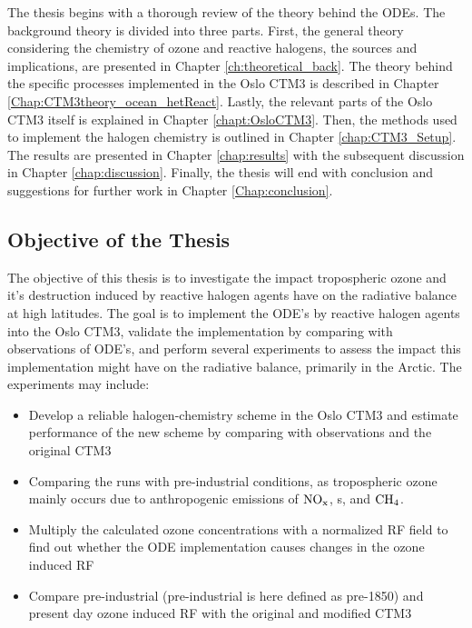The thesis begins with a thorough review of the theory behind the ODEs. The background theory is divided into three parts. First, the general theory considering the chemistry of ozone and reactive halogens, the sources and implications, are presented in Chapter \ref{ch:theoretical_back}. The theory behind the specific processes implemented in the Oslo CTM3 is described in Chapter \ref{Chap:CTM3theory_ocean_hetReact}. Lastly, the relevant parts of the Oslo CTM3 itself is explained in Chapter \ref{chapt:OsloCTM3}. Then, the methods used to implement the halogen chemistry is outlined in Chapter \ref{chap:CTM3_Setup}. The results are presented in Chapter \ref{chap:results} with the subsequent discussion in Chapter \ref{chap:discussion}. Finally, the thesis will end with conclusion and suggestions for further work in Chapter \ref{Chap:conclusion}. 


\subsection{Objective of the Thesis}

The objective of this thesis is to investigate the impact tropospheric ozone and it's destruction induced by reactive halogen agents have on the radiative balance at high latitudes. The goal is to implement the ODE's by reactive halogen agents into the Oslo CTM3, validate the implementation by comparing with observations of ODE's, and perform several experiments to assess the  impact this implementation might have on the radiative balance, primarily in the Arctic. The experiments may include: 

\begin{itemize}
    \item Develop a reliable halogen-chemistry scheme in the Oslo CTM3 and estimate performance of the new scheme by comparing with observations and the original CTM3
    \item Comparing the runs with pre-industrial conditions, as tropospheric ozone mainly occurs due to anthropogenic emissions of $\mathrm{NO_x}$, s,  and $\mathrm{CH_4}$.
    \item Multiply the calculated ozone concentrations with a normalized RF field to find out whether the ODE implementation causes changes in the ozone induced RF
    \item Compare pre-industrial (pre-industrial is here defined as pre-1850) and present day ozone induced RF with the original and modified CTM3
\end{itemize}

